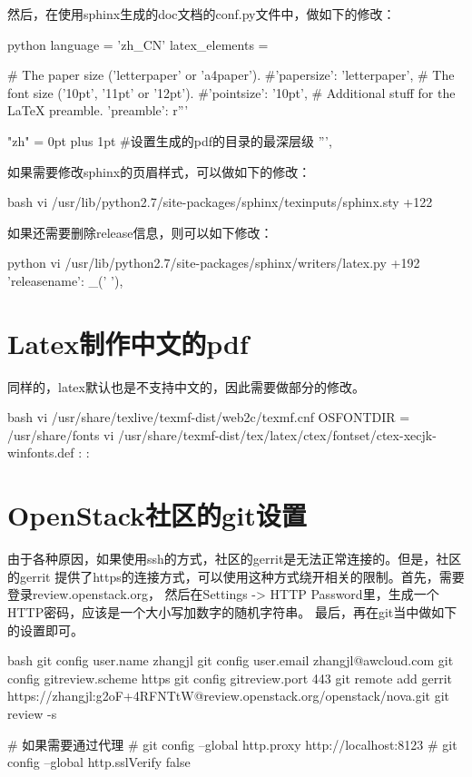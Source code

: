 然后，在使用sphinx生成的doc文档的conf.py文件中，做如下的修改：
\begin{code-block}{python}
language = 'zh_CN'
latex_elements = {
# The paper size ('letterpaper' or 'a4paper').
#'papersize': 'letterpaper',
# The font size ('10pt', '11pt' or '12pt').
#'pointsize': '10pt',
# Additional stuff for the LaTeX preamble.
'preamble': r'''
     \usepackage{xeCJK}
     \XeTeXlinebreaklocale "zh"
     \XeTeXlinebreakskip = 0pt plus 1pt
     \setcounter{tocdepth}{4}  #设置生成的pdf的目录的最深层级
''',
}
\end{code-block}

如果需要修改sphinx的页眉样式，可以做如下的修改：
\begin{code-block}{bash}
vi /usr/lib/python2.7/site-packages/sphinx/texinputs/sphinx.sty +122
\fancyhead[LE,RO]{{\py@HeaderFamily \@title}}
\end{code-block}

如果还需要删除release信息，则可以如下修改：
\begin{code-block}{python}
vi /usr/lib/python2.7/site-packages/sphinx/writers/latex.py +192
'releasename':  _(' '),
\end{code-block}

\section{Latex制作中文的pdf}
同样的，latex默认也是不支持中文的，因此需要做部分的修改。
\begin{code-block}{bash}
vi /usr/share/texlive/texmf-dist/web2c/texmf.cnf
OSFONTDIR = /usr/share/fonts
vi /usr/share/texmf-dist/tex/latex/ctex/fontset/ctex-xecjk-winfonts.def
:%
:%
\end{code-block}

\section{OpenStack社区的git设置}
由于各种原因，如果使用ssh的方式，社区的gerrit是无法正常连接的。但是，社区的gerrit
提供了https的连接方式，可以使用这种方式绕开相关的限制。首先，需要登录review.openstack.org，
然后在Settings -> HTTP Password里，生成一个HTTP密码，应该是一个大小写加数字的随机字符串。
最后，再在git当中做如下的设置即可。
\begin{code-block}{bash}
git config user.name zhangjl
git config user.email zhangjl@awcloud.com
git config gitreview.scheme https
git config gitreview.port 443
git remote add gerrit https://zhangjl:g2oF+4RFNTtW@review.openstack.org/openstack/nova.git
git review -s

# 如果需要通过代理
# git config --global http.proxy http://localhost:8123
# git config --global http.sslVerify false
\end{code-block}

